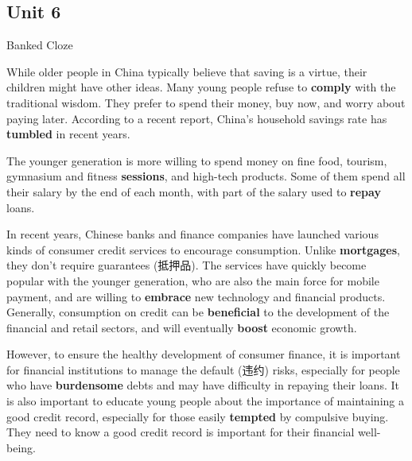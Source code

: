 \newpage
\subsection{Unit 6}

\begin{question}{Banked Cloze}

While older people in China typically believe that saving is a virtue, their children might have other ideas. Many young people refuse to \textbf{\color{red} comply} with the traditional wisdom. They prefer to spend their money, buy now, and worry about paying later. According to a recent report, China's household savings rate has \textbf{\color{red} tumbled} in recent years.

\vspace{1em}

The younger generation is more willing to spend money on fine food, tourism, gymnasium and fitness \textbf{\color{red} sessions}, and high-tech products. Some of them spend all their salary by the end of each month, with part of the salary used to \textbf{\color{red} repay} loans.

\vspace{1em}

In recent years, Chinese banks and finance companies have launched various kinds of consumer credit services to encourage consumption. Unlike \textbf{\color{red} mortgages}, they don't require guarantees (抵押品). The services have quickly become popular with the younger generation, who are also the main force for mobile payment, and are willing to \textbf{\color{red} embrace} new technology and financial products. Generally, consumption on credit can be \textbf{\color{red} beneficial} to the development of the financial and retail sectors, and will eventually \textbf{\color{red} boost} economic growth.

\vspace{1em}

However, to ensure the healthy development of consumer finance, it is important for financial institutions to manage the default (违约) risks, especially for people who have \textbf{\color{red} burdensome} debts and may have difficulty in repaying their loans. It is also important to educate young people about the importance of maintaining a good credit record, especially for those easily \textbf{\color{red} tempted} by compulsive buying. They need to know a good credit record is important for their financial well-being.

\end{question}
